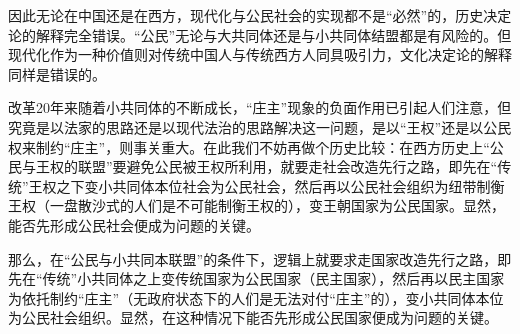 \documentclass[a4paper,12pt,punct=kaiming,fontset=none]{ctexart}
\begin{document}
因此无论在中国还是在西方，现代化与公民社会的实现都不是“必然”的，历史决定论的解释完全错误。“公民”无论与大共同体还是与小共同体结盟都是有风险的。但现代化作为一种价值则对传统中国人与传统西方人同具吸引力，文化决定论的解释同样是错误的。

改革20年来随着小共同体的不断成长，“庄主”现象的负面作用已引起人们注意，但究竟是以法家的思路还是以现代法治的思路解决这一问题，是以“王权”还是以公民权来制约“庄主”，则事关重大。在此我们不妨再做个历史比较：在西方历史上“公民与王权的联盟”要避免公民被王权所利用，就要走社会改造先行之路，即先在“传统”王权之下变小共同体本位社会为公民社会，然后再以公民社会组织为纽带制衡王权（一盘散沙式的人们是不可能制衡王权的），变王朝国家为公民国家。显然，能否先形成公民社会便成为问题的关键。

那么，在“公民与小共同本联盟”的条件下，逻辑上就要求走国家改造先行之路，即先在“传统”小共同体之上变传统国家为公民国家（民主国家），然后再以民主国家为依托制约“庄主”（无政府状态下的人们是无法对付“庄主”的），变小共同体本位为公民社会组织。显然，在这种情况下能否先形成公民国家便成为问题的关键。
\end{document}
